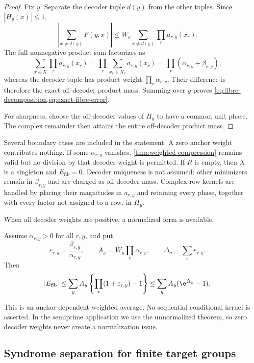 \begin{proof}
Fix $y$.  Separate the decoder tuple $d(y)$ from the other tuples.  Since $|H_y(x)|\leq1$,
\[
 \left|\sum_{x\neq d(y)}F(y,x)\right|
 \leq W_y\sum_{x\neq d(y)}\prod_r a_{r,y}(x_r).
\]
The full nonnegative product sum factorizes as
\[
 \sum_{x\in X}\prod_r a_{r,y}(x_r)
 =\prod_r\sum_{x_r\in X_r}a_{r,y}(x_r)
 =\prod_r(\alpha_{r,y}+\beta_{r,y}),
\]
whereas the decoder tuple has product weight $\prod_r\alpha_{r,y}$.  Their difference is therefore the exact off-decoder product mass.  Summing over $y$ proves \cref{eq:fibre-decomposition,eq:exact-fibre-error}.

For sharpness, choose the off-decoder values of $H_y$ to have a common unit phase.  The complex remainder then attains the entire off-decoder product mass.
\end{proof}

Several boundary cases are included in the statement.  A zero anchor weight contributes nothing.  If some $\alpha_{r,y}$ vanishes, \cref{thm:weighted-compression} remains valid but no division by that decoder weight is permitted.  If $R$ is empty, then $X$ is a singleton and $E_{\mathrm{fib}}=0$.  Decoder uniqueness is not assumed: other minimizers remain in $\beta_{r,y}$ and are charged as off-decoder mass.  Complex row kernels are handled by placing their magnitudes in $a_{r,y}$ and retaining every phase, together with every factor not assigned to a row, in $H_y$.

When all decoder weights are positive, a normalized form is available.

\begin{corollary}
\label{cor:normalized-fibre}
Assume $\alpha_{r,y}>0$ for all $r,y$, and put
\[
 \varepsilon_{r,y}=\frac{\beta_{r,y}}{\alpha_{r,y}},
 \qquad
 A_y=W_y\prod_r\alpha_{r,y},
 \qquad
 \Delta_y=\sum_r\varepsilon_{r,y}.
\]
Then
\[
 |E_{\mathrm{fib}}|
 \leq\sum_yA_y\left\{\prod_r(1+\varepsilon_{r,y})-1\right\}
 \leq\sum_yA_y(\e^{\Delta_y}-1).
\]
\end{corollary}

This is an anchor-dependent weighted average.  No sequential conditional kernel is asserted.  In the semiprime application we use the unnormalized theorem, so zero decoder weights never create a normalization issue.

\subsection{Syndrome separation for finite target groups}

